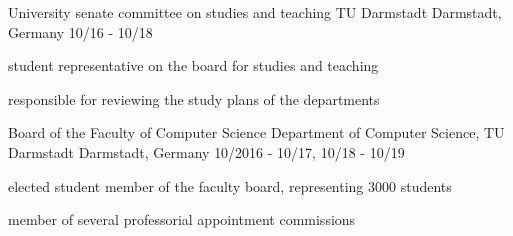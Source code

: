 \begin{cventries}
  \cventry
    {University senate committee on studies and teaching} %
    {TU Darmstadt} %
    {Darmstadt, Germany} %
    {10/16 - 10/18} %
    {
      \begin{cvitems} %
        \item {student representative on the board for studies and teaching}
        \item {responsible for reviewing the study plans of the departments}
      \end{cvitems}
    }

  \cventry
    {Board of the Faculty of Computer Science} %
    {Department of Computer Science, TU Darmstadt} %
    {Darmstadt, Germany} %
    {10/2016 - 10/17, 10/18 - 10/19} %
    {
      \begin{cvitems} %
        \item {elected student member of the faculty board, representing 3000 students}
        \item {member of several professorial appointment commissions}
      \end{cvitems}
    }


\end{cventries}
